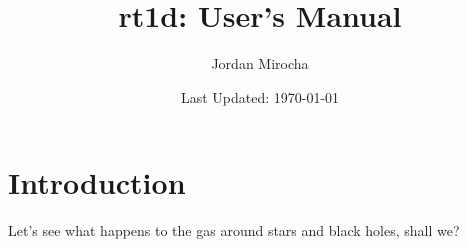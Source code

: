 \documentclass[letterpaper,titlepage,12pt]{article}
\numberwithin{equation}{section}
\begin{document}
    
\newcommand{\HI}{\text{HI}}
\newcommand{\HII}{\text{HII}}
\newcommand{\HeI}{\text{HeI}}
\newcommand{\HeII}{\text{HeII}}
\newcommand{\HeIII}{\text{HeIII}}
\newcommand{\nH}{n_{\text{H}}} 
\newcommand{\nHI}{n_{\text{HI}}} 
\newcommand{\nHII}{n_{\text{HII}}}  
\newcommand{\nHeI}{n_{\text{HeI}}}
\newcommand{\nHeII}{n_{\text{HeII}}}
\newcommand{\nHeIII}{n_{\text{HeIII}}}  
\newcommand{\nel}{n_{\text{e}}}  
\newcommand{\nb}{n_{\text{b}}}
\newcommand{\nnu}{$n_{\nu}$ }
\newcommand{\ncol}{n_i^{\text{col}}}
\newcommand{\gHI}{\Gamma_{\text{HI}}}  
\newcommand{\gHeI}{\Gamma_{\text{HeI}}}
\newcommand{\gHeII}{\Gamma_{\text{HeII}}}
\newcommand{\aHII}{\alpha_{\text{HII}}}  
\newcommand{\aHeII}{\alpha_{\text{HeII}}}  
\newcommand{\aHeIII}{\alpha_{\text{HeIII}}}
\newcommand{\bHI}{\beta_{\text{HI}}} 
\newcommand{\bHeI}{\beta_{\text{HeI}}}  
\newcommand{\bHeII}{\beta_{\text{HeII}}}  
\newcommand{\xHeII}{\xi_{\text{HeII}}}
\newcommand{\kB}{k_{\text{B}}}
\newcommand{\fheat}{f_i^{\text{heat}}}
\newcommand{\fion}{f_i^{\text{ion}}}
\newcommand{\Lbol}{\mathcal{L}_{\text{bol}}}
\newcommand{\spec}{\mathcal{N}}
\newcommand{\Heat}{\mathcal{H}}
\newcommand{\trec}{$t_{\text{rec}}$}
\newcommand{\Lbox}{L_{\mathrm{box}}}
\newcommand{\dx}{\Delta x}
\newcommand{\dd}{\text{d}}
\newcommand{\Htwo}{\mathrm{H}_2}
\newcommand{\eV}{\mathrm{eV}}
	
\author{Jordan Mirocha}	
	
\title{\Large {\bf rt1d: User's Manual}}
\date{Last Updated: \today}
\maketitle

\setcounter{tocdepth}{2}
\tableofcontents
\newpage

\section{Introduction}
Let's see what happens to the gas around stars and black holes, shall we?

\end{document}
